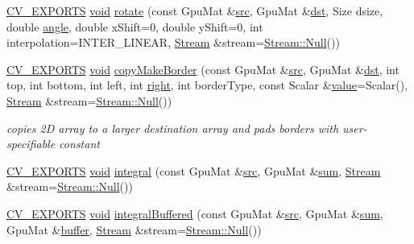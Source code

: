 \begin{DoxyCompactItemize}
\hyperlink{core_2types__c_8h_a1bf9f0e121b54272da02379cfccd0a2b}{C\-V\-\_\-\-E\-X\-P\-O\-R\-T\-S} \hyperlink{legacy_8hpp_a8bb47f092d473522721002c86c13b94e}{void} \hyperlink{namespacecv_1_1gpu_a9a754d4e24ef674789858af05942980b}{rotate} (const Gpu\-Mat \&\hyperlink{legacy_8hpp_a371cd109b74033bc4366f584edd3dacc}{src}, Gpu\-Mat \&\hyperlink{photo__c_8h_aed13e2a25279b24dc954073233fef7a5}{dst}, Size dsize, double \hyperlink{imgproc__c_8h_a79dea7ed146af26ff4a0ba4bf5c83eee}{angle}, double x\-Shift=0, double y\-Shift=0, int interpolation=I\-N\-T\-E\-R\-\_\-\-L\-I\-N\-E\-A\-R, \hyperlink{classcv_1_1gpu_1_1Stream}{Stream} \&stream=\hyperlink{classcv_1_1gpu_1_1Stream_af96c23564834f88333dcb8997df553f1}{Stream\-::\-Null}())
\item 
\hyperlink{core_2types__c_8h_a1bf9f0e121b54272da02379cfccd0a2b}{C\-V\-\_\-\-E\-X\-P\-O\-R\-T\-S} \hyperlink{legacy_8hpp_a8bb47f092d473522721002c86c13b94e}{void} \hyperlink{namespacecv_1_1gpu_a44caac13f69340101faf8eccaa1efe27}{copy\-Make\-Border} (const Gpu\-Mat \&\hyperlink{legacy_8hpp_a371cd109b74033bc4366f584edd3dacc}{src}, Gpu\-Mat \&\hyperlink{photo__c_8h_aed13e2a25279b24dc954073233fef7a5}{dst}, int top, int bottom, int left, int \hyperlink{legacy_8hpp_a6b04b878081bf724144b73c75dfd1894}{right}, int border\-Type, const Scalar \&\hyperlink{highgui__c_8h_ad4670c92695d4327c21292905a803901}{value}=Scalar(), \hyperlink{classcv_1_1gpu_1_1Stream}{Stream} \&stream=\hyperlink{classcv_1_1gpu_1_1Stream_af96c23564834f88333dcb8997df553f1}{Stream\-::\-Null}())
\begin{DoxyCompactList}\small\item\em copies 2\-D array to a larger destination array and pads borders with user-\/specifiable constant \end{DoxyCompactList}\item 
\hyperlink{core_2types__c_8h_a1bf9f0e121b54272da02379cfccd0a2b}{C\-V\-\_\-\-E\-X\-P\-O\-R\-T\-S} \hyperlink{legacy_8hpp_a8bb47f092d473522721002c86c13b94e}{void} \hyperlink{namespacecv_1_1gpu_a23274e16c4795ffcb786107b71cfb70a}{integral} (const Gpu\-Mat \&\hyperlink{legacy_8hpp_a371cd109b74033bc4366f584edd3dacc}{src}, Gpu\-Mat \&\hyperlink{namespacecv_1_1gpu_a5292ab871ffc965df3968dbe6b9f7b20}{sum}, \hyperlink{classcv_1_1gpu_1_1Stream}{Stream} \&stream=\hyperlink{classcv_1_1gpu_1_1Stream_af96c23564834f88333dcb8997df553f1}{Stream\-::\-Null}())
\item 
\hyperlink{core_2types__c_8h_a1bf9f0e121b54272da02379cfccd0a2b}{C\-V\-\_\-\-E\-X\-P\-O\-R\-T\-S} \hyperlink{legacy_8hpp_a8bb47f092d473522721002c86c13b94e}{void} \hyperlink{namespacecv_1_1gpu_a06b669ddbbb8134df5655dca1334863b}{integral\-Buffered} (const Gpu\-Mat \&\hyperlink{legacy_8hpp_a371cd109b74033bc4366f584edd3dacc}{src}, Gpu\-Mat \&\hyperlink{namespacecv_1_1gpu_a5292ab871ffc965df3968dbe6b9f7b20}{sum}, Gpu\-Mat \&\hyperlink{legacy_8hpp_ac4a77e2a1d3f8442ce13847f9c3025b9}{buffer}, \hyperlink{classcv_1_1gpu_1_1Stream}{Stream} \&stream=\hyperlink{classcv_1_1gpu_1_1Stream_af96c23564834f88333dcb8997df553f1}{Stream\-::\-Null}())

\end{DoxyCompactItemize}

